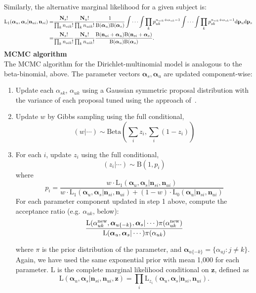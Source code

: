 \documentclass{article}
\begin{document}
\noindent Similarly, the alternative marginal likelihood for a given subject is:
\[
\begin{split}
\mathrm{L_1}(\boldsymbol{\alpha}_u,\boldsymbol{\alpha}_s|\mathbf{n}_{ui},\mathbf{n}_{si})
=&\frac{\mathbf{N}_s!}{\prod_k {n}_{sik}!}\frac{\mathbf{N}_u!}{\prod_k {n}_{uik}!}\frac{1}{\mathrm{B}(\boldsymbol{\alpha}_u)\mathrm{B}(\boldsymbol{\alpha}_s)}\idotsint\prod_k p^{n_{uik}+\alpha_{uk}-1}_{uk}\idotsint \prod_k p^{n_{sik}+\alpha_{sk}-1}_{sk}\mathrm{d}\mathbf{p}_u\mathrm{d}\mathbf{p}_s\\
=&\frac{\mathbf{N}_s!}{\prod_k {n}_{sik}!}\frac{\mathbf{N}_u!}{\prod_k {n}_{uik}!}\frac{\mathrm{B}(\mathbf{n}_{ui}+\boldsymbol{\alpha}_u)\mathrm{B}(\mathbf{n}_{si}+\boldsymbol{\alpha}_s)}{\mathrm{B}(\boldsymbol{\alpha}_u)\mathrm{B}(\boldsymbol{\alpha}_s)}.
\end{split}
\]
\noindent\textbf{MCMC algorithm}\\
The MCMC algorithm for the Dirichlet-multinomial model is analogous to the beta-binomial, above. The parameter vectors $\boldsymbol{\alpha}_s,\boldsymbol{\alpha}_u$ are updated component-wise:
\begin{enumerate}
\item  Update each $\alpha_{sk}$, $\alpha_{uk}$ using a Gaussian symmetric proposal distribution with the variance of each proposal tuned using the approach of~\cite{Gelman:2004tc}.
\item Update $w$ by Gibbs sampling using the full conditional,
\[
(w|\cdots)\sim\mathrm{Beta}(\sum_i z_i,\sum_i(1-z_i))
\]
\item For each $i$, update $z_i$ using the full conditional,
\[
(z_i|\cdots)\sim \mathrm{B}(1,p_i)
\]
where
\[
p_i = \frac{w\cdot\mathrm{L_1}(\boldsymbol{\alpha}_{u},\boldsymbol{\alpha}_s|\mathbf{n}_{si},\mathbf{n}_{ui})}{w\cdot\mathrm{L_1}(\boldsymbol{\alpha}_{u},\boldsymbol{\alpha}_s|\mathbf{n}_{si},\mathbf{n}_{ui})+(1-w)\cdot\mathrm{L_0}(\boldsymbol{\alpha}_{u}|\mathbf{n}_{si},\mathbf{n}_{ui})}
\]
For each parameter component updated in step 1 above, compute the acceptance ratio (e.g. $\alpha_{uk}$, below):
\[
\frac{\mathrm{L}(\alpha^{\text{new}}_{uk},\boldsymbol{\alpha}_{u\{-k\}},\boldsymbol{\alpha}_s|\cdots)\pi(\alpha^{\text{new}}_{uk})}{\mathrm{L}(\boldsymbol{\alpha}_u,\boldsymbol{\alpha}_s|\cdots)\pi(\alpha_{uk})}\\
\]

where $\pi$ is the prior distribution of the parameter, and $\boldsymbol{\alpha}_{u\{-k\}} = \{\alpha_{uj} :  j\neq k\}$. Again, we have used the same exponential prior with mean 1,000 for each parameter. $\mathrm{L}$ is the complete marginal likelihood conditional on $\mathbf{z}$, defined as
\[
\mathrm{L}(\boldsymbol{\alpha}_u,\boldsymbol{\alpha}_s|\mathbf{n}_{si},\mathbf{n}_{ui},\mathbf{z}) = \prod_i \mathrm{L}_{z_i}(\boldsymbol{\alpha}_u,\boldsymbol{\alpha}_s|\mathbf{n}_{si},\mathbf{n}_{ui}).
\]

\end{enumerate}
\end{document}
